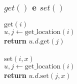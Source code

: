 \documentclass{beamer}
\begin{document}
\begin{frame}[shrink]
\frametitle{$get()$ e $set()$}
\begin{oframed}
\begin{flushleft}
\hspace*{1em} \ensuremath{\mathrm{get}(\ensuremath{\mathit{i}})}\\
\hspace*{1em} \hspace*{1em} \ensuremath{\ensuremath{\mathit{u}}, \ensuremath{j} \gets  \ensuremath{\mathrm{get\_location}(\ensuremath{\mathit{i}})}}\\
\hspace*{1em} \hspace*{1em} {\color{black} \textbf{return}} \ensuremath{\ensuremath{\mathit{u}}.\ensuremath{\mathit{d}}.\mathrm{get}(\ensuremath{\mathit{j}})}\\
\ \\
\hspace*{1em} \ensuremath{\mathrm{set}(\ensuremath{\mathit{i}}, \ensuremath{\mathit{x}})}\\
\hspace*{1em} \hspace*{1em} \ensuremath{\ensuremath{\mathit{u}}, \ensuremath{j} \gets  \ensuremath{\mathrm{get\_location}(\ensuremath{\mathit{i}})}}\\
\hspace*{1em} \hspace*{1em} {\color{black} \textbf{return}} \ensuremath{\ensuremath{\mathit{u}}.\ensuremath{\mathit{d}}.\mathrm{set}(\ensuremath{\mathit{j}}, \ensuremath{\mathit{x}})}\\
\end{flushleft}
\end{oframed}

\end{frame}
\end{document}
